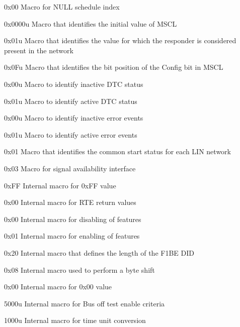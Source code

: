 {
{0x00}
{Macro for NULL schedule index}
}
{  }

{
{0x0000u}
{Macro that identifies the initial value of MSCL}

{0x01u}
{Macro that identifies the value for which the responder is considered present in the network}

{0x0Fu}
{Macro that identifies the bit position of the Config bit in MSCL}
}
{}

{
{0x00u}
{Macro to identify inactive DTC status}

{0x01u}
{Macro to identify active DTC status}
}
{ }

{
{0x00u}
{Macro to identify inactive error events}

{0x01u}
{Macro to identify active error events}
}
{    }

{0x01}
{Macro that identifies the common start status for each LIN network}

{0x03}
{Macro for signal availability interface}

{0xFF}
{Internal macro for 0xFF value}

{0x00}
{Internal macro for RTE return values}

{0x00}
{Internal macro for disabling of features}

{0x01}
{Internal macro for enabling of features}

{0x20}
{Internal macro that defines the length of the F1BE DID}

{0x08}
{Internal macro used to perform a byte shift}

{0x00}
{Internal macro for 0x00 value}

{5000u}
{Internal macro for Bus off test enable criteria}

{1000u}
{Internal macro for time unit conversion}

